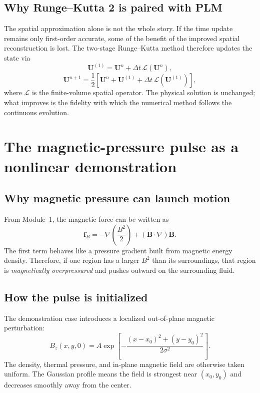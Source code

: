 \documentclass[11pt]{article}
\newcommand{\Bvec}{\mathbf{B}}
\newcommand{\Uvec}{\mathbf{U}}
\begin{document}
\subsection{Why Runge--Kutta 2 is paired with PLM}
The spatial approximation alone is not the whole story. If the time update remains only first-order accurate, some of the benefit of the improved spatial reconstruction is lost. The two-stage Runge--Kutta method therefore updates the state via
\begin{equation}
\Uvec^{(1)} = \Uvec^n + \Delta t\,\mathcal{L}(\Uvec^n),
\end{equation}
\begin{equation}
\Uvec^{n+1}
=
\frac12
\left[
\Uvec^n
+
\Uvec^{(1)}
+
\Delta t\,\mathcal{L}(\Uvec^{(1)})
\right],
\label{eq:m2-rk2}
\end{equation}
where $\mathcal{L}$ is the finite-volume spatial operator. The physical solution is unchanged; what improves is the fidelity with which the numerical method follows the continuous evolution.

\section{The magnetic-pressure pulse as a nonlinear demonstration}

\subsection{Why magnetic pressure can launch motion}
From Module~1, the magnetic force can be written as
\begin{equation}
\mathbf{f}_B
=
-\nabla\left(\frac{B^2}{2}\right)
+
(\Bvec\cdot\nabla)\Bvec.
\end{equation}
The first term behaves like a pressure gradient built from magnetic energy density. Therefore, if one region has a larger $B^2$ than its surroundings, that region is \emph{magnetically overpressured} and pushes outward on the surrounding fluid.

\subsection{How the pulse is initialized}
The demonstration case introduces a localized out-of-plane magnetic perturbation:
\begin{equation}
B_z(x,y,0)
=
A\exp\left[
-\frac{(x-x_0)^2+(y-y_0)^2}{2\sigma^2}
\right].
\label{eq:m2-gaussian}
\end{equation}
The density, thermal pressure, and in-plane magnetic field are otherwise taken uniform. The Gaussian profile means the field is strongest near $(x_0,y_0)$ and decreases smoothly away from the center.
\end{document}
